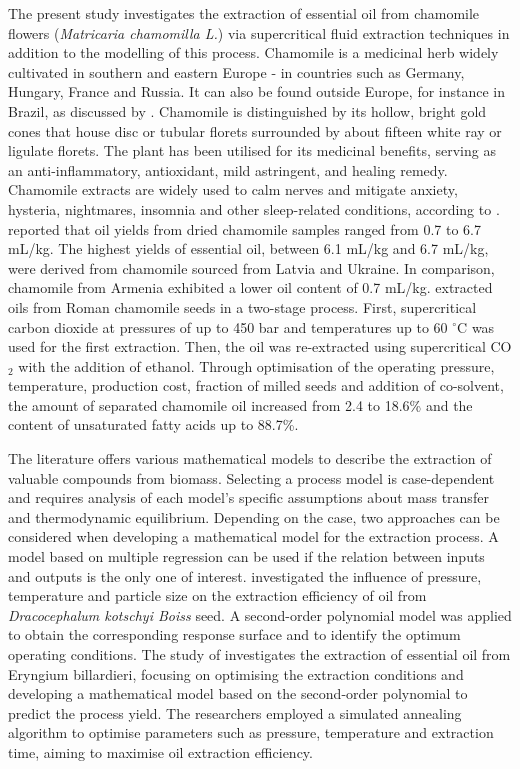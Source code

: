 \documentclass[a4paper,fleqn]{cas-dc}
\begin{document}
The present study investigates the extraction of essential oil from chamomile flowers (\textit{Matricaria chamomilla L.}) via supercritical fluid extraction techniques in addition to the modelling of this process. Chamomile is a medicinal herb widely cultivated in southern and eastern Europe - in countries such as Germany, Hungary, France and Russia. It can also be found outside Europe, for instance in Brazil, as discussed by \citet{Singh2011}. Chamomile is distinguished by its hollow, bright gold cones that house disc or tubular florets surrounded by about fifteen white ray or ligulate florets. The plant has been utilised for its medicinal benefits, serving as an anti-inflammatory, antioxidant, mild astringent, and healing remedy. Chamomile extracts are widely used to calm nerves and mitigate anxiety, hysteria, nightmares, insomnia and other sleep-related conditions, according to \citet{Srivastava2009}. \citet{Orav2010} reported that oil yields from dried chamomile samples ranged from 0.7 to 6.7 mL/kg. The highest yields of essential oil, between 6.1 mL/kg and 6.7 mL/kg, were derived from chamomile sourced from Latvia and Ukraine. In comparison, chamomile from Armenia exhibited a lower oil content of 0.7 mL/kg. \citet{Milovanovic2023} extracted oils from Roman chamomile seeds in a two-stage process. First, supercritical carbon dioxide at pressures of up to 450 bar and temperatures up to 60 $^\circ$C was used for the first extraction. Then, the oil was re-extracted using supercritical CO$_2$ with the addition of ethanol. Through optimisation of the operating pressure, temperature, production cost, fraction of milled seeds and addition of co-solvent, the amount of separated chamomile oil increased from 2.4 to 18.6\% and the content of unsaturated fatty acids up to 88.7\%.

The literature offers various mathematical models to describe the extraction of valuable compounds from biomass. Selecting a process model is case-dependent and requires analysis of each model's specific assumptions about mass transfer and thermodynamic equilibrium. Depending on the case, two approaches can be considered when developing a mathematical model for the extraction process. A model based on multiple regression can be used if the relation between inputs and outputs is the only one of interest. \citet{Sodeifian2017a} investigated the influence of pressure, temperature and particle size on the extraction efficiency of oil from \textit{Dracocephalum kotschyi Boiss} seed. A second-order polynomial model was applied to obtain the corresponding response surface and to identify the optimum operating conditions. The study of \citet{Sodeifian2017b} investigates the extraction of essential oil from Eryngium billardieri, focusing on optimising the extraction conditions and developing a mathematical model based on the second-order polynomial to predict the process yield. The researchers employed a simulated annealing algorithm to optimise parameters such as pressure, temperature and extraction time, aiming to maximise oil extraction efficiency.
\end{document}
